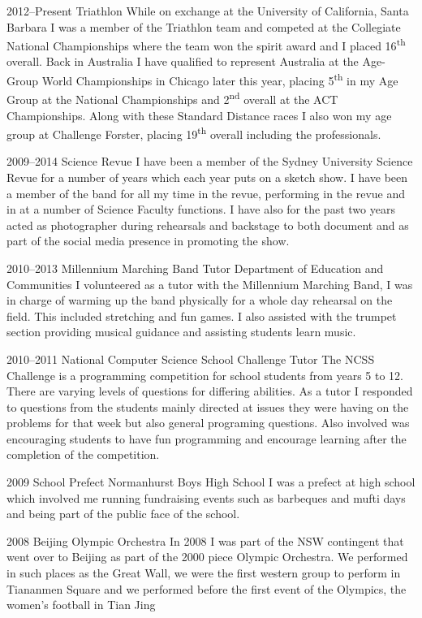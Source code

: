\documentclass{friggeri-cv} %
\begin{document}
\begin{entrylist}


\entry
{2012--Present}
{Triathlon}
{}
{While on exchange at the University of California, Santa Barbara I was a member of the Triathlon team and competed at the Collegiate National Championships where the team won the spirit award and I placed 16\textsuperscript{th} overall. Back in Australia I have qualified to represent Australia at the Age-Group World Championships in Chicago later this year, placing 5\textsuperscript{th} in my Age Group at the National Championships and 2\textsuperscript{nd} overall at the ACT Championships. Along with these Standard Distance races I also won my age group at Challenge Forster, placing 19\textsuperscript{th} overall including the professionals.}

\entry
{2009--2014}
{Science Revue}
{}
{I have been a member of the Sydney University Science Revue for a number of years which each year puts on a sketch show. I have been a member of the band for all my time in the revue, performing in the revue and in at a number of Science Faculty functions. I have also for the past two years acted as photographer during rehearsals and backstage to both document and as part of the social media presence in promoting the show.
}

\entry
{2010--2013}
{Millennium Marching Band Tutor}
{Department of Education and Communities}
{I volunteered as a tutor with the Millennium Marching Band, I was in charge of warming up the band physically for a whole day rehearsal on the field. This included stretching and fun games. I also assisted with the trumpet section providing musical guidance and assisting students learn music.}

\entry
{2010--2011}
{National Computer Science School Challenge Tutor}
{}
{The NCSS Challenge is a programming competition for school students from years 5 to 12. There are varying levels of questions for differing abilities. As a tutor I responded to questions from the students mainly directed at issues they were having on the problems for that week but also general programing questions. Also involved was encouraging students to have fun programming and encourage learning after the completion of the competition.}

\entry
{2009}
{School Prefect}
{Normanhurst Boys High School}
{I was a prefect at high school which involved me running fundraising events such as barbeques and mufti days and being part of the public face of the school.}

\entry
{2008}
{Beijing Olympic Orchestra}
{}
{In 2008 I was part of the NSW contingent that went over to Beijing as part of the 2000 piece Olympic Orchestra. We performed in such places as the Great Wall, we were the first western group to perform in Tiananmen Square and we performed before the first event of the Olympics, the women's football in Tian Jing}


\end{entrylist}
\end{document}
